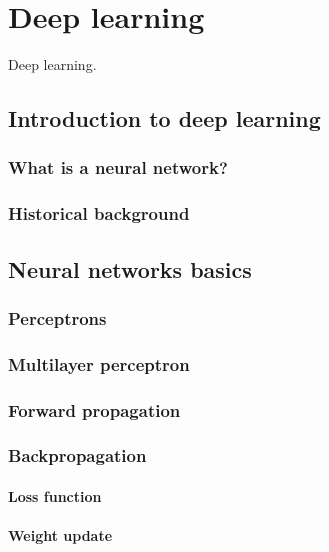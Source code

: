 
\chapter{Deep learning}
\label{ch:deep_learning}

Deep learning.

\section{Introduction to deep learning}

\subsection{What is a neural network?}

\subsection{Historical background}




\section{Neural networks basics}

\subsection{Perceptrons}


\subsection{Multilayer perceptron}


\subsection{Forward propagation}


\subsection{Backpropagation}

\subsubsection{Loss function}

\subsubsection{Weight update}




